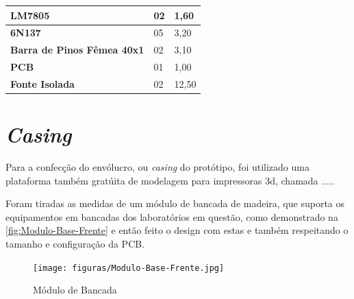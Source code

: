 \begin{table}[!ht]
\begin{tabular}{|l|l|l|}
        \textbf{LM7805}                        & 02                  & 1,60                             \\ \hline
        \textbf{6N137}                         & 05                  & 3,20                             \\ \hline
        \textbf{Barra de Pinos Fêmea 40x1}     & 02                  & 3,10                             \\ \hline
        \textbf{PCB}                           & 01                  & 1,00                             \\ \hline
        \textbf{Fonte Isolada}                 & 02                  & 12,50                            \\ \hline
    \end{tabular}
\end{table}

\section{\textit{Casing}}\label{Casing}

Para a confecção do envólucro, ou \textit{casing} do protótipo, foi utilizado uma plataforma também gratúita de modelagem para impressoras 3d, chamada .....

Foram tiradas as medidas de um módulo de bancada de madeira, que suporta os equipamentos em bancadas dos laboratórios em questão, como demonstrado na \autoref{fig:Modulo-Base-Frente} e então feito o design com estas e também respeitando o tamanho e configuração da \gls{PCB}.

\begin{figure}[htb!]
    \caption{Módulo de Bancada}
    \label{fig:Modulo-Base-Frente}
    \texttt{[image: figuras/Modulo-Base-Frente.jpg]}
    \fonte{}
\end{figure}